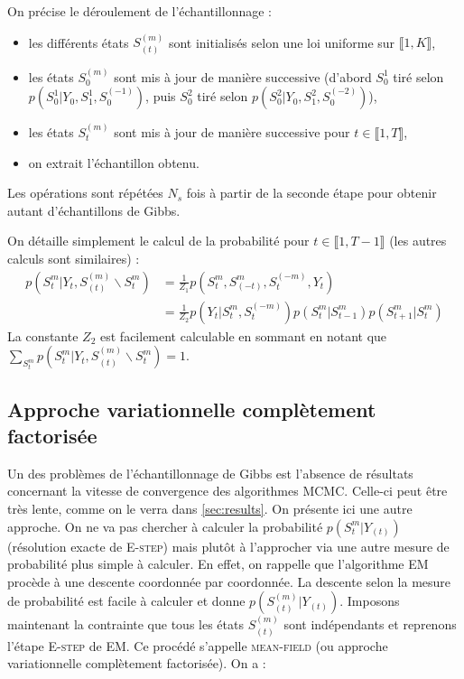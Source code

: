 \documentclass[10pt,a4paper]{article}
\newcommand{\mcmc}{\textsc{MCMC}}
\newcommand{\Estep}{\textsc{E-step}}
\newcommand{\EM}{\textsc{EM}}
\newcommand{\meanfield}{\textsc{mean-field}}
\begin{document}
On précise le déroulement de l'échantillonnage :
\begin{itemize}
  \item les différents états $S_{(t)}^{(m)}$ sont initialisés selon une loi 
    uniforme sur $\llbracket 1,K \rrbracket$,
  \item les états $S_0^{(m)}$ sont mis à jour de manière successive (d'abord 
    $S_0^1$ tiré selon $p(S_0^1 \vert Y_{0}, S_1^1, S_0^{(-1)})$, puis $S_0^2$ tiré 
    selon $p(S_0^2 \vert Y_{0}, S_1^2, S_0^{(-2)})$),
  \item les états $S_t^{(m)}$ sont mis à jour de manière successive pour $t \in 
    \llbracket 1,T \rrbracket$,
  \item on extrait l'échantillon obtenu.
\end{itemize}
Les opérations sont répétées $N_s$ fois à partir de la seconde étape pour
obtenir autant d'échantillons de Gibbs.

On détaille simplement le calcul de la probabilité pour $t \in \llbracket 1,T-1 
\rrbracket$ (les autres calculs sont similaires) :
\begin{equation}
\begin{aligned}
p(S_t^m \vert Y_t, S_{(t)}^{(m)} \backslash S_t^m)&=\frac{1}{Z_1}p(S_t^{m}, 
S_{(-t)}^{m}, S_{t}^{(-m)},Y_t) \\
&=\frac{1}{Z_2}p(Y_t \vert S_t^{m},S_t^{(-m)}) p(S_t^m \vert S_{t-1}^m) 
p(S_{t+1}^m \vert S_t^m)
\end{aligned}
\end{equation}
La constante $Z_2$ est facilement calculable en sommant en notant que 
$\underset{S_t^m}{\sum}p(S_t^m \vert Y_t, S_{(t)}^{(m)} \backslash S_t^m)=1$.

\subsection{Approche variationnelle complètement factorisée}

Un des problèmes de l'échantillonnage de Gibbs est l'absence de résultats 
concernant la vitesse de convergence des algorithmes \mcmc{}.
Celle-ci peut être très lente, comme on le verra dans \ref{sec:results}.
On présente ici une autre approche.
On ne va pas chercher à calculer la probabilité $p( S_t^m \vert Y_{(t)})$
(résolution exacte de \Estep{}) mais plutôt à l'approcher via une autre mesure
de probabilité plus simple à calculer.
En effet, on rappelle que l'algorithme \EM{} procède à une descente coordonnée
par coordonnée.
La descente selon la mesure de probabilité est facile à calculer et donne
$p(S_{(t)}^{(m)} \vert Y_{(t)})$.
Imposons maintenant la contrainte que tous les états $S_{(t)}^{(m)}$ sont
indépendants et reprenons l'étape \Estep{} de \EM.
Ce procédé s'appelle \meanfield{} (ou approche variationnelle complètement
factorisée).
On a :
\end{document}
